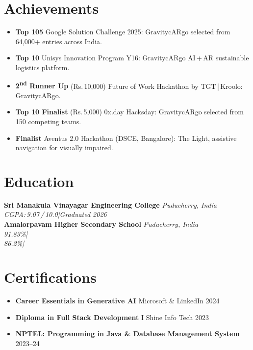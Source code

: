 \documentclass[8pt, a4paper]{article}
\begin{document}
\section{Achievements}
{\footnotesize
\begin{itemize}[topsep=0.8pt, itemsep=0.4pt]
  \item \textbf{Top 105} \textemdash{} Google Solution Challenge 2025: GravitycARgo selected from 64,000+ entries across India.
  \item \textbf{Top 10} \textemdash{} Unisys Innovation Program Y16: GravitycARgo AI\,+\,AR sustainable logistics platform.
  \item \textbf{2\textsuperscript{nd} Runner Up} (Rs.\,10,000) \textemdash{} Future of Work Hackathon by TGT\,|\,Kroolo: GravitycARgo.
  \item \textbf{Top 10 Finalist} (Rs.\,5,000) \textemdash{} 0x.day Hacksday: GravitycARgo selected from 150 competing teams.
  \item \textbf{Finalist} \textemdash{} Aventus 2.0 Hackathon (DSCE, Bangalore): The Light, assistive navigation for visually impaired.
\end{itemize}
}
\section{Education}
\noindent\textbf{Sri Manakula Vinayagar Engineering College}\hfill
  {\small\textit{Puducherry, India}}\\[-1pt]
\hfill
  {\small\textit{CGPA:\,9.07\,/\,10.0\enspace|\enspace Graduated 2026}}\\[1.5pt]
\noindent\textbf{Amalorpavam Higher Secondary School}\hfill
  {\small\textit{Puducherry, India}}\\[-1pt]
\hfill
  {\small\textit{91.83\%\enspace|}}\\[-2pt]
\hfill
  {\small\textit{86.2\%\enspace|}}
\section{Certifications}
{\footnotesize
\begin{itemize}[topsep=0.8pt, itemsep=0.4pt]
  \item \textbf{Career Essentials in Generative AI} \textemdash{} Microsoft \& LinkedIn \hfill 2024
  \item \textbf{Diploma in Full Stack Development} \textemdash{} I Shine Info Tech \hfill 2023
  \item \textbf{NPTEL: Programming in Java \& Database Management System}  \hfill 2023--24
\end{itemize}
}
\end{document}
